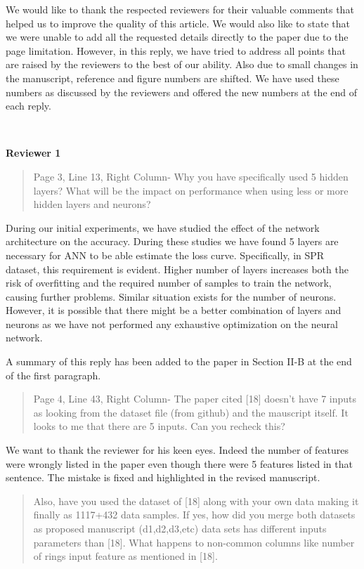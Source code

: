 \documentclass{article}
\begin{document}
	We would like to thank the respected reviewers for their valuable comments that helped us to improve the quality of this article. We would also like to state that we were unable to add all the requested details directly to the paper due to the page limitation. However, in this reply, we have tried to address all points that are raised by the reviewers to the best of our ability. Also due to small changes in the manuscript, reference and figure numbers are shifted. We have used these numbers as discussed by the reviewers and offered the new numbers at the end of each reply.
	
	~
	
	{\bfseries\large Reviewer 1}
	
	\begin{quote}
	Page 3, Line 13, Right Column- Why you have specifically used 5 hidden layers? What will be the impact on performance when using less or more hidden layers and neurons?
	\end{quote}
	
	During our initial experiments, we have studied the effect of the network architecture on the accuracy. During these studies we have found 5 layers are necessary for ANN to be able estimate the loss curve. Specifically, in SPR dataset, this requirement is evident. Higher number of layers increases both the risk of overfitting and the required number of samples to train the network, causing further problems. Similar situation exists for the number of neurons. However, it is possible that there might be a better combination of layers and neurons as we have not performed any exhaustive optimization on the neural network.
	
	A summary of this reply has been added to the paper in Section II-B at the end of the first paragraph.
	
	\begin{quote}
	Page 4, Line 43, Right Column- The paper cited [18] doesn't have 7 inputs as looking from the dataset file (from github) and the mauscript itself. It looks to me that there are 5 inputs. Can you recheck this?
	\end{quote}
	
	We want to thank the reviewer for his keen eyes. Indeed the number of features were wrongly listed in the paper even though there were 5 features listed in that sentence. The mistake is fixed and highlighted in the revised manuscript.
	
	\begin{quote}
	Also, have you used the dataset of [18] along with your own data making it finally as 1117+432 data samples. If yes, how did you merge both datasets as proposed manuscript (d1,d2,d3,etc) data sets has different inputs parameters than [18]. What happens to non-common columns like number of rings input feature as mentioned in [18].
	\end{quote}
	
\end{document}
